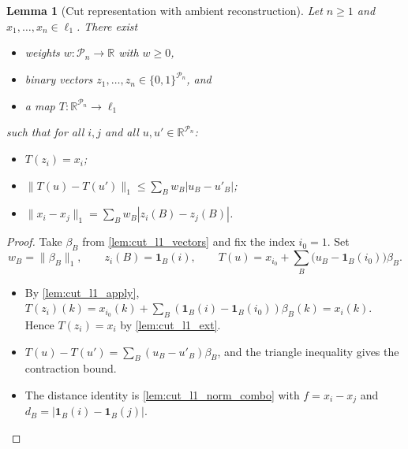\documentclass[11pt]{article}
\newtheorem{lemma}[theorem]{Lemma}
\theoremstyle{definition}
\theoremstyle{remark}
\newcommand{\one}{\mathbf{1}}
\newcommand{\R}{\mathbb{R}}
\newcommand{\Pn}{\mathcal{P}_n}
\begin{document}
\begin{lemma}[Cut representation with ambient reconstruction]\label{lem:cut_l1}
Let $n\ge1$ and $x_1,\dots,x_n\in\ell_1$. There exist
\begin{itemize}
\item weights $w:\Pn\to\R$ with $w\ge0$,
\item binary vectors $z_1,\dots,z_n\in\{0,1\}^{\Pn}$, and
\item a map $T:\R^{\Pn}\to\ell_1$
\end{itemize}
such that for all $i,j$ and all $u,u'\in\R^{\Pn}$:
\begin{itemize}
\item $T(z_i)=x_i$;
\item $\|T(u)-T(u')\|_1\le\sum_Bw_B|u_B-u'_B|$;
\item $\|x_i-x_j\|_1=\sum_Bw_B|z_i(B)-z_j(B)|$.
\end{itemize}
\end{lemma}
\begin{proof}
Take $\beta_B$ from \cref{lem:cut_l1_vectors} and fix the index $i_0=1$. Set
\[
w_B=\|\beta_B\|_1,\qquad z_i(B)=\one_B(i),\qquad T(u)=x_{i_0}+\sum_B\bigl(u_B-\one_B(i_0)\bigr)\beta_B .
\]
\begin{itemize}
\item By \cref{lem:cut_l1_apply}, $T(z_i)(k)=x_{i_0}(k)+\sum_B(\one_B(i)-\one_B(i_0))\beta_B(k)=x_i(k)$. Hence $T(z_i)=x_i$ by \cref{lem:cut_l1_ext}.
\item $T(u)-T(u')=\sum_B(u_B-u'_B)\beta_B$, and the triangle inequality gives the contraction bound.
\item The distance identity is \cref{lem:cut_l1_norm_combo} with $f=x_i-x_j$ and $d_B=|\one_B(i)-\one_B(j)|$. \qedhere
\end{itemize}
\end{proof}
\end{document}
